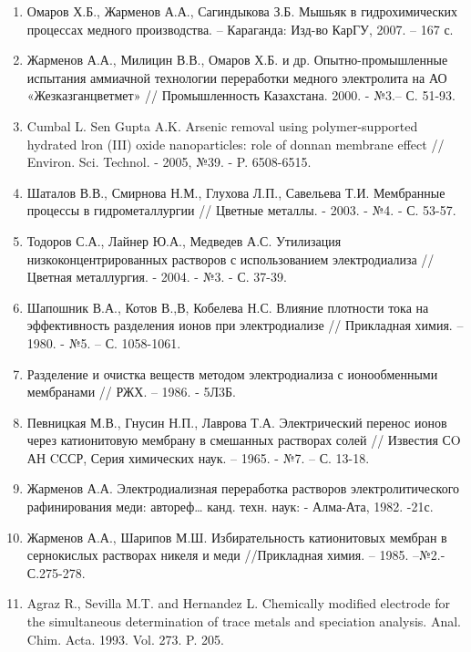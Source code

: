 \begin{enumerate}
\item
Омаров Х.Б., Жарменов А.А., Сагиндыкова З.Б. Мышьяк в гидрохимических
процессах медного производства. -- Караганда: Изд-во КарГУ, 2007. -- 167
с.

\item
Жарменов А.А., Милицин В.В., Омаров Х.Б. и др. Опытно-промышленные
испытания аммиачной технологии переработки медного электролита на АО
«Жезказганцветмет» // Промышленность Казахстана. 2000. - №3.-- С. 51-93.

\item
Cumbal L. Sen Gupta A.K. Arsenic removal using polymer-supported
hydrated lron (III) oxide nanoparticles: role of donnan membrane effect
// Environ. Sci. Technol. - 2005, №39. - P. 6508-6515.

\item
Шаталов В.В., Смирнова Н.М., Глухова Л.П., Савельева Т.И. Мембранные
процессы в гидрометаллургии // Цветные металлы. - 2003. - №4. - С.
53-57.

\item
Тодоров С.А., Лайнер Ю.А., Медведев А.С. Утилизация
низкоконцентрированных растворов с использованием электродиализа //
Цветная металлургия. - 2004. - №3. - С. 37-39.

\item
Шапошник В.А., Котов В.,В, Кобелева Н.С. Влияние плотности тока на
эффективность разделения ионов при электродиализе // Прикладная химия.
-- 1980. - №5. -- С. 1058-1061.

\item
Разделение и очистка веществ методом электродиализа с ионообменными
мембранами // РЖХ. -- 1986. - 5Л3Б.

\item
Певницкая М.В., Гнусин Н.П., Лаврова Т.А. Электрический перенос ионов
через катионитовую мембрану в смешанных растворах солей // Известия СO
АН CССР, Серия химических наук. -- 1965. - №7. -- С. 13-18.

\item
Жарменов А.А. Электродиализная переработка растворов
электролитического рафинирования меди: автореф\ldots{} канд. техн. наук:
- Алма-Ата, 1982. -21с.

\item
Жарменов А.А., Шарипов М.Ш. Избирательность катионитовых мембран в
сернокислых растворах никеля и меди //Прикладная химия. -- 1985.
--№2.-С.275-278.

\item
Agraz R., Sevilla M.T. and Hernandez L. Chemically modified
electrode for the simultaneous determination of trace metals and
speciation analysis. Anal. Chim. Acta. 1993. Vol. 273. P. 205.


\end{enumerate}
